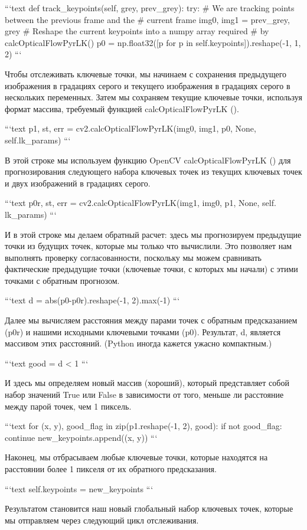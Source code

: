 ```text
def track_keypoints(self, grey, prev_grey): try:
# We are tracking points between the previous frame and the # current frame
img0, img1 = prev_grey, grey
# Reshape the current keypoints into a numpy array required # by calcOpticalFlowPyrLK()
p0 = np.float32([p for p in self.keypoints]).reshape(-1, 1,
2)
```

Чтобы отслеживать ключевые точки, мы начинаем с сохранения предыдущего изображения в градациях серого и текущего изображения в градациях серого в нескольких переменных. Затем мы сохраняем текущие ключевые точки, используя формат массива, требуемый функцией calcOpticalFlowPyrLK ().

```text
p1, st, err = cv2.calcOpticalFlowPyrLK(img0, img1, p0, None, \textbf{}self.lk_params)
```

В этой строке мы используем функцию OpenCV calcOpticalFlowPyrLK () для прогнозирования следующего набора ключевых точек из текущих ключевых точек и двух изображений в градациях серого.

```text
p0r, st, err = cv2.calcOpticalFlowPyrLK(img1, img0, p1, None, \textbf{}self. lk_params)
```

И в этой строке мы делаем обратный расчет: здесь мы прогнозируем предыдущие точки из будущих точек, которые мы только что вычислили. Это позволяет нам выполнять проверку согласованности, поскольку мы можем сравнивать фактические предыдущие точки (ключевые точки, с которых мы начали) с этими точками с обратным прогнозом.

```text
d = abs(p0-p0r).reshape(-1, 2).max(-1)
```

Далее мы вычисляем расстояния между парами точек с обратным предсказанием (p0r) и нашими исходными ключевыми точками (p0). Результат, d, является массивом этих расстояний. (Python иногда кажется ужасно компактным.)

```text
good = d < 1
```

И здесь мы определяем новый массив (хороший), который представляет собой набор значений True или False в зависимости от того, меньше ли расстояние между парой точек, чем 1 пиксель.

```text
for (x, y), good_flag in zip(p1.reshape(-1, 2), good): if not good_flag:
continue
new_keypoints.append((x, y))
```

Наконец, мы отбрасываем любые ключевые точки, которые находятся на расстоянии более 1 пикселя от их обратного предсказания.

```text
self.keypoints = new_keypoints
```

Результатом становится наш новый глобальный набор ключевых точек, которые мы отправляем через следующий цикл отслеживания.

